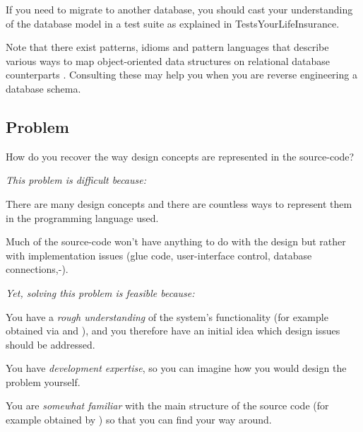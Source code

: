 \documentclass[a4paper,10pt,twoside]{book}
\begin{document}
If you need to migrate to another database, you should cast your understanding of the 
database model in a test suite as explained in 
{TestsYourLifeInsurance}.

Note that there exist patterns, idioms and pattern languages that describe various ways to 
map object-oriented data structures on relational database counterparts \cite{Brow96d} 
\cite{Kell98a}. Consulting these may help you when you are reverse engineering a database 
schema.



\subsection*{Problem}

How do you recover the way design concepts are represented in the source-code?

\emph{This problem is difficult because:}

\begin{bulletlist}

\item There are many design concepts and there are countless ways to represent them in the 
programming language used.

\item Much of the source-code won't have anything to do with the design but rather with 
implementation issues (glue code, user-interface control, database connections,-).
\end{bulletlist}

\emph{Yet, solving this problem is feasible because:}

\begin{bulletlist}
\item You have a \emph{rough understanding} of the system's functionality (for example 
obtained via  and 
), and you therefore have an initial 
idea which design issues should be addressed.

\item You have \emph{development expertise}, so you can imagine how you would design the 
problem yourself.

\item You are \emph{somewhat familiar} with the main structure of the source code (for 
example obtained by ) so 
that you can find your way around.
\end{bulletlist}
\end{document}
